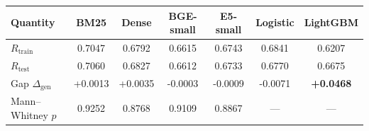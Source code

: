 \begin{tabular}{lSSSSSS}
\toprule
\textbf{Quantity} & \textbf{BM25} & \textbf{Dense} & \textbf{BGE-small} & \textbf{E5-small} & \textbf{Logistic} & \textbf{LightGBM} \\
\midrule
$R_{\text{train}}$ & 0.7047 & 0.6792 & 0.6615 & 0.6743 & 0.6841 & 0.6207 \\
$R_{\text{test}}$ & 0.7060 & 0.6827 & 0.6612 & 0.6733 & 0.6770 & 0.6675 \\
Gap $\Delta_{\text{gen}}$ & +0.0013 & +0.0035 & -0.0003 & -0.0009 & -0.0071 & \textbf{+0.0468} \\
Mann--Whitney $p$ & 0.9252 & 0.8768 & 0.9109 & 0.8867 & {---} & {---} \\
\bottomrule
\end{tabular}
